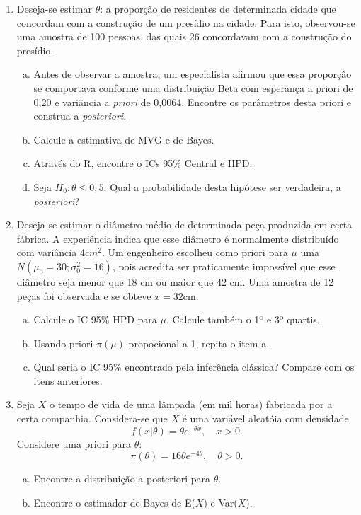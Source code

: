 \documentclass[10pt,brazil,addpoints]{exam}
\begin{document}
\begin{enumerate}[1.]

\item  Deseja-se estimar $\theta$: a proporção de residentes de determinada cidade que concordam com a construção de um presídio na cidade. Para isto, observou-se uma amostra de 100 pessoas, das quais 26 concordavam com a construção do presídio.

\begin{enumerate}[a)]
\item Antes de observar a amostra, um especialista afirmou que essa proporção se comportava conforme uma distribuição Beta com esperança a priori de 0,20 e variância a \textit{priori} de 0,0064. Encontre os parâmetros desta priori e construa a \textit{posteriori}.

\item Calcule a estimativa de MVG e de Bayes.
\item  Através do R, encontre o ICs 95\% Central e HPD.
\item Seja $H_0 : \theta \leq  0, 5$. Qual a probabilidade desta hipótese ser verdadeira, a \textit{posteriori}?
\end{enumerate}

\item Deseja-se estimar o diâmetro médio de determinada peça produzida em certa fábrica. A experiência indica que esse diâmetro é normalmente distribuído com variância 4$cm^2$.
Um engenheiro escolheu como priori para $\mu$ uma $N(\mu_0 = 30; \sigma_0^2=16)$, pois acredita ser praticamente impossível que esse diâmetro seja menor que 18 cm ou maior que 42 cm. Uma amostra de 12 peças foi observada e se obteve $\overline{x}=32$cm.

\begin{enumerate}[a)]
    \item Calcule o IC 95\% HPD para $\mu$. Calcule também o 1º
e 3º quartis.
\item Usando priori $\pi(\mu)$ propocional a 1, repita o item a.
\item Qual seria o IC 95\% encontrado pela inferência clássica? Compare com os itens anteriores.

\end{enumerate}

\item Seja $X$ o tempo de vida de uma lâmpada (em mil horas) fabricada por a certa companhia. Considera-se que $X$ é  uma variável aleatóia com densidade
\[f(x|\theta)=\theta e^{-\theta x},\quad x>0.\]
Considere uma priori para $\theta$: 
\[\pi(\theta)=16\theta e^{-4\theta},\quad \theta>0.\]


\begin{enumerate}[a)]
    \item Encontre a distribuição a posteriori para $\theta$.
    
    \item Encontre o estimador de Bayes de E($X$) e Var($X$). 

\end{enumerate}

\end{enumerate}
\end{document}
